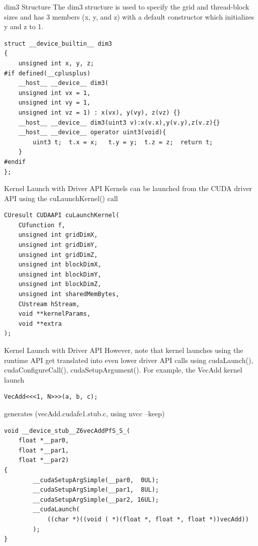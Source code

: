\documentclass[handout]{beamer}
\begin{document}
\begin{frame}[fragile]{{\selectfont dim3} Structure}
The {\selectfont dim3} structure is used to specify the grid and thread-block sizes and has 3 members ({\selectfont x}, {\selectfont y}, and {\selectfont z}) with a default constructor which initializes {\selectfont y} and {\selectfont z} to 1.
\begin{lstlisting}[caption={{\fontfamily{qcr}\selectfont dim3} structure definition defined in {\fontfamily{qcr}\selectfont vector\_types.h}}]
struct __device_builtin__ dim3
{
    unsigned int x, y, z;
#if defined(__cplusplus)
    __host__ __device__ dim3(
    unsigned int vx = 1,
    unsigned int vy = 1,
    unsigned int vz = 1) : x(vx), y(vy), z(vz) {}
    __host__ __device__ dim3(uint3 v):x(v.x),y(v.y),z(v.z){}
    __host__ __device__ operator uint3(void){
        uint3 t;  t.x = x;   t.y = y;  t.z = z;  return t;
    }
#endif
};
\end{lstlisting}
\end{frame}

\begin{frame}[fragile]{Kernel Launch with Driver API}
Kernels can be launched from the CUDA driver API using the {\selectfont cuLaunchKernel()} call 
\begin{lstlisting}[caption={{\fontfamily{qcr}\selectfont cuLaunchKernel()} in the CUDA driver API}]
CUresult CUDAAPI cuLaunchKernel(
    CUfunction f,
    unsigned int gridDimX,
    unsigned int gridDimY,
    unsigned int gridDimZ,
    unsigned int blockDimX,
    unsigned int blockDimY,
    unsigned int blockDimZ,
    unsigned int sharedMemBytes,
    CUstream hStream,
    void **kernelParams,
    void **extra
);
\end{lstlisting}
\end{frame}

\begin{frame}[fragile]{Kernel Launch with Driver API}
However, note that kernel launches using the runtime API get translated into even lower driver API calls using {\selectfont cudaLaunch()}, {\selectfont cudaConfigureCall()}, {\selectfont cudaSetupArgument()}.  For example, the {\selectfont VecAdd} kernel launch
\begin{lstlisting}
VecAdd<<<1, N>>>(a, b, c);
\end{lstlisting}
generates ({\selectfont vecAdd.cudafe1.stub.c}, using {\selectfont nvcc} {\selectfont --keep})
\begin{lstlisting}[]
void __device_stub__Z6vecAddPfS_S_(
    float *__par0, 
    float *__par1, 
    float *__par2)
{
        __cudaSetupArgSimple(__par0,  0UL);
        __cudaSetupArgSimple(__par1,  8UL);
        __cudaSetupArgSimple(__par2, 16UL);
        __cudaLaunch(
            ((char *)((void ( *)(float *, float *, float *))vecAdd))
        );
}
\end{lstlisting}
\end{frame}
\end{document}

